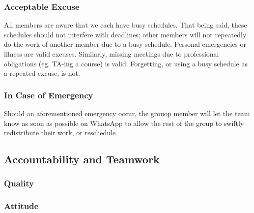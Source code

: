 \documentclass{article}
\begin{document}
\subsubsection*{Acceptable Excuse}

\iffalse
\wss{What constitutes an acceptable excuse for missing a meeting or a deadline?
What types of excuses will not be considered acceptable?}
\fi

All members are aware that we each have busy schedules. That being said, these 
schedules should not interfere with deadlines; other members will not repeatedly 
do the work of another member due to a busy schedule. Personal emergencies or illness 
are valid excuses. Similarly, missing meetings due to professional obligations (eg. 
TA-ing a course) is valid. Forgetting, or using a busy schedule as a repeated excuse, is not.

\subsubsection*{In Case of Emergency}

\iffalse
\wss{What process will team members follow if they have an emergency and cannot
attend a team meeting or complete their individual work promised for a team
deliverable?}
\fi

Should an aforementioned emergency occur, the grouop member will let the team know as 
soon as possible on WhatsApp to allow the rest of the group to swiftly redistribute 
their work, or reschedule.

\subsection*{Accountability and Teamwork}

\subsubsection*{Quality} 


\subsubsection*{Attitude}

\end{document}
